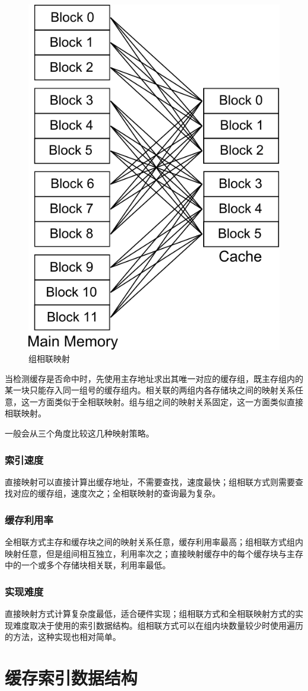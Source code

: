\begin{figure}[!htb]
\centering
\includegraphics[width=0.4\linewidth]{./graph/cache-map-3}
\caption{组相联映射}
\label{fig:cache-map-3}
\end{figure}

当检测缓存是否命中时，先使用主存地址求出其唯一对应的缓存组，既主存组内的某一块只能存入同一组号的缓存组内。相关联的两组内各存储块之间的映射关系任意，这一方面类似于全相联映射。组与组之间的映射关系固定，这一方面类似直接相联映射。

一般会从三个角度比较这几种映射策略。
\subsubsection{索引速度}
直接映射可以直接计算出缓存地址，不需要查找，速度最快；组相联方式则需要查找对应的缓存组，速度次之；全相联映射的查询最为复杂。
\subsubsection{缓存利用率}
全相联方式主存和缓存块之间的映射关系任意，缓存利用率最高；组相联方式组内映射任意，但是组间相互独立，利用率次之；直接映射缓存中的每个缓存块与主存中的一个或多个存储块相关联，利用率最低。
\subsubsection{实现难度}
直接映射方式计算复杂度最低，适合硬件实现；组相联方式和全相联映射方式的实现难度取决于使用的索引数据结构。组相联方式可以在组内块数量较少时使用遍历的方法，这种实现也相对简单。

\section{缓存索引数据结构}
\label{sec:cache_indexing}

